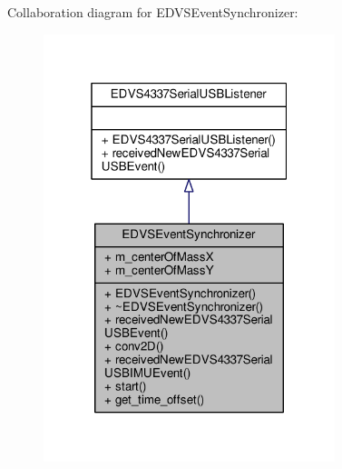 Collaboration diagram for E\+D\+V\+S\+Event\+Synchronizer\+:
\nopagebreak
\begin{figure}[H]
\begin{center}
\leavevmode
\includegraphics[width=241pt]{class_e_d_v_s_event_synchronizer__coll__graph}
\end{center}
\end{figure}
